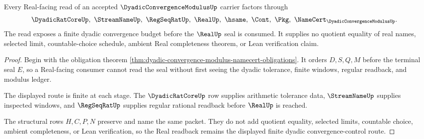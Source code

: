 \begin{theorem}
\label{thm:dyadic-convergence-modulus-real-readback}
Every Real-facing read of an accepted $\DyadicConvergenceModulusUp$ carrier factors through
$$
\DyadicRatCoreUp,\ \StreamNameUp,\ \RegSeqRatUp,\ \RealUp,\ \hsame,\ \Cont,\ \Pkg,\ \NameCert_{\DyadicConvergenceModulusUp}.
$$
The read exposes a finite dyadic convergence budget before the $\RealUp$ seal is consumed. It supplies no quotient equality of real names, selected limit, countable-choice schedule, ambient Real completeness theorem, or Lean verification claim.
\end{theorem}
\begin{proof}
Begin with the obligation theorem \autoref{thm:dyadic-convergence-modulus-namecert-obligations}. It orders $D,S,Q,M$ before the terminal seal $E$, so a Real-facing consumer cannot read the seal without first seeing the dyadic tolerance, finite windows, regular readback, and modulus ledger.

The displayed route is finite at each stage. The $\DyadicRatCoreUp$ row supplies arithmetic tolerance data, $\StreamNameUp$ supplies inspected windows, and $\RegSeqRatUp$ supplies regular rational readback before $\RealUp$ is reached.

The structural rows $H,C,P,N$ preserve and name the same packet. They do not add quotient equality, selected limits, countable choice, ambient completeness, or Lean verification, so the Real readback remains the displayed finite dyadic convergence-control route.
\end{proof}


\begin{closurestatus}{\DyadicConvergenceModulusUp}
  \theoryclosure{\seedClosure}
  \formalstatus{\unformalizedV}
\end{closurestatus}
